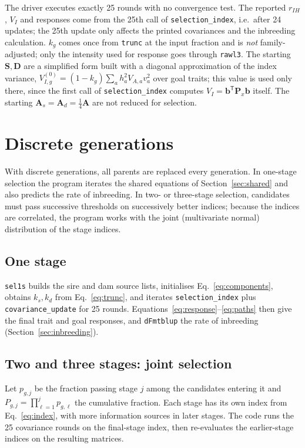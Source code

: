 \documentclass[11pt]{article}
\newcommand{\src}[1]{\texttt{#1}}
\newcommand{\ve}[1]{\boldsymbol{#1}}
\newcommand{\ma}[1]{\mathbf{#1}}
\begin{document}
\begin{codenote}
The driver executes exactly 25 rounds with no convergence test. The reported $r_{IH}$, $V_I$ and responses come from the 25th call of \src{selection\_index}, i.e.\ after 24 updates; the 25th update only affects the printed covariances and the inbreeding calculation. $k_g$ comes once from \src{trunc} at the input fraction and is \emph{not} family-adjusted; only the intensity used for response goes through \src{rawl3}. The starting $\ma S,\ma D$ are a simplified form built with a diagonal approximation of the index variance, $V_{I,g}^{(0)}=(1-k_g)\sum_a h_a^2V_{A,a}v_a^2$ over goal traits; this value is used only there, since the first call of \src{selection\_index} computes $V_I=\ve b^{\mathsf T}\ma P_x\ve b$ itself. The starting $\ma A_s=\ma A_d=\tfrac14\ma A$ are not reduced for selection.
\end{codenote}

\section{Discrete generations}\label{sec:discrete}
\begin{inwords}
With discrete generations, all parents are replaced every generation. In one-stage selection the program iterates the shared equations of Section~\ref{sec:shared} and also predicts the rate of inbreeding. In two- or three-stage selection, candidates must pass successive thresholds on successively better indices; because the indices are correlated, the program works with the joint (multivariate normal) distribution of the stage indices.
\end{inwords}

\subsection{One stage}
\src{sel1s} builds the sire and dam source lists, initialises Eq.~\eqref{eq:components}, obtains $k_s,k_d$ from Eq.~\eqref{eq:trunc}, and iterates \src{selection\_index} plus \src{covariance\_update} for 25 rounds. Equations~\eqref{eq:response}--\eqref{eq:paths} then give the final trait and goal responses, and \src{dFmtblup} the rate of inbreeding (Section~\ref{sec:inbreeding}).

\subsection{Two and three stages: joint selection}
Let $p_{g,j}$ be the fraction passing stage $j$ among the candidates entering it and $P_{g,j}=\prod_{\ell=1}^{j}p_{g,\ell}$ the cumulative fraction. Each stage has its own index from Eq.~\eqref{eq:index}, with more information sources in later stages. The code runs the 25 covariance rounds on the final-stage index, then re-evaluates the earlier-stage indices on the resulting matrices.
\end{document}
